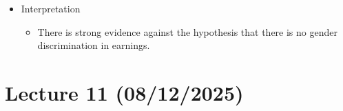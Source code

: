 \documentclass{article}
\begin{document}
\begin{itemize}
\begin{itemize}
\begin{itemize}
                \item Since $4.472 > 1.96$, we reject $H_0$ at the $5\%$ significance level
            \end{itemize}
            \item Interpretation
            \begin{itemize}
                \item There is strong evidence against the hypothesis that there is no gender discrimination in earnings.
            \end{itemize}
        \end{itemize}
\end{itemize}

\section{Lecture 11 (08/12/2025)}
\end{document}
